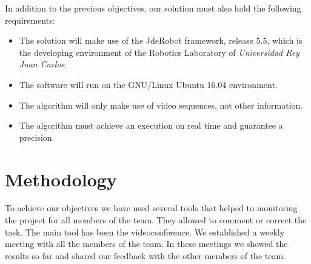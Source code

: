 In addition to the previous objectives, our solution must also hold the following requirements:

\begin{itemize}

\item The solution will make use of the JdeRobot framework, release 5.5, which is the developing environment of the Robotics Laboratory of \textit{Universidad Rey Juan Carlos}.

\item The software will run on the GNU/Linux Ubuntu 16.04 environment.

\item The algorithm will only make use of video sequences, not other information.

\item The algorithm must achieve an execution on real time and guarantee a precision.


\end{itemize}

%
%
%
%
%
%
%
%



\section{Methodology}

To achieve our objectives we have used several tools that helped to monitoring the project for all members of the team. They allowed to comment or correct the task. The main tool has been the videoconference. We established a weekly meeting with all the members of the team. In these meetings we showed the results so far and shared our feedback with the other members of the team. 

